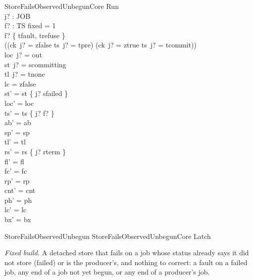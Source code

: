 \documentclass[a4paper,10pt,fleqn]{article}
\begin{document}
\begin{schema}{StoreFailsObservedUnbegunCore}
\Delta Run \\ j? : JOB \\ f? : TS
\where
fixed = 1 \\
f? \in \{ tfault, trefuse \} \\
((ck~j? = zfalse \land ts~j? = tpre) \lor (ck~j? = ztrue \land ts~j? = tcommit)) \\
loc~j? = out \\
st~j? = scommitting \\
tl~j? = tnone \\
lc = zfalse \\
st' = st \oplus \{ j? \mapsto sfailed \} \\
loc' = loc \\
ts' = ts \oplus \{ j? \mapsto f? \} \\
ab' = ab \\
sp' = sp \\
tl' = tl \\
rs' = rs \oplus \{ j? \mapsto rterm \} \\
fl' = fl \\
fc' = fc \\
rp' = rp \\
cnt' = cnt \\
ph' = ph \\
lc' = lc \\
bx' = bx
\end{schema}

\begin{zed}
StoreFailsObservedUnbegun  StoreFailsObservedUnbegunCore \land Latch
\end{zed}

\emph{Fixed build.} A detached store that fails on a job whose status already
says it did not store (failed) or is the producer's, and nothing to correct:
a fault on a failed job, any end of a job not yet begun, or any end of a producer's
job.
\end{document}
